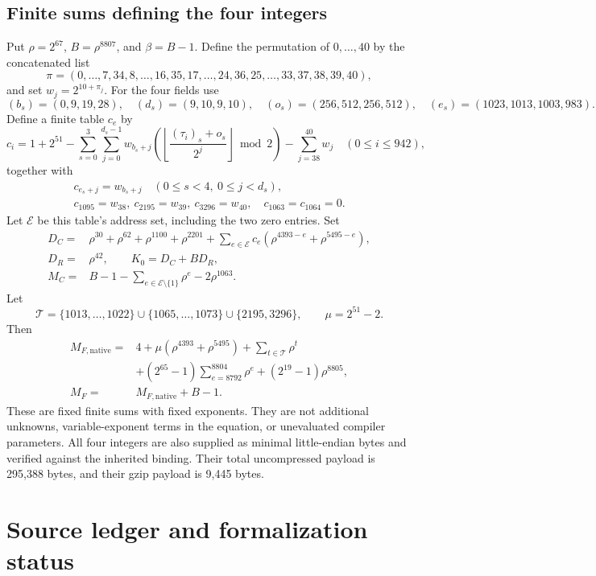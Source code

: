 \documentclass[11pt]{article}
\theoremstyle{definition}
\theoremstyle{remark}
\begin{document}
\subsection{Finite sums defining the four integers}

Put $\rho=2^{67}$, $B=\rho^{8807}$, and $\beta=B-1$. Define the permutation
of $0,\ldots,40$ by the concatenated list
\[
 \pi=(0,\ldots,7,34,8,\ldots,16,35,17,\ldots,24,36,
       25,\ldots,33,37,38,39,40),
\]
and set $w_j=2^{10+\pi_j}$. For the four fields use
\[
 (b_s)=(0,9,19,28),\quad (d_s)=(9,10,9,10),\quad
 (o_s)=(256,512,256,512),\quad (e_s)=(1023,1013,1003,983).
\]
Define a finite table $c_e$ by
\[
 c_i=1+2^{51}-\sum_{s=0}^3\sum_{j=0}^{d_s-1}
 w_{b_s+j}\left(\left\lfloor\frac{(\tau_i)_s+o_s}{2^j}\right\rfloor\bmod2\right)
       -\sum_{j=38}^{40}w_j\quad(0\le i\le942),
\]
together with
\[
 \begin{gathered}
 c_{e_s+j}=w_{b_s+j}\quad(0\le s<4,\ 0\le j<d_s),\\
 c_{1095}=w_{38},\ c_{2195}=w_{39},\ c_{3296}=w_{40},\quad
 c_{1063}=c_{1064}=0.
 \end{gathered}
\]
Let $\mathcal E$ be this table's address set, including the two zero entries.
Set
\begin{align*}
 D_C={}&\rho^{30}+\rho^{62}+\rho^{1100}+\rho^{2201}
       +\sum_{e\in\mathcal E}c_e(\rho^{4393-e}+\rho^{5495-e}),\\
 D_R={}&\rho^{42},\qquad K_0=D_C+BD_R,\\
 M_C={}&B-1-\sum_{e\in\mathcal E\setminus\{1\}}\rho^e-2\rho^{1063}.
\end{align*}
Let
\[
 \mathcal T=\{1013,\ldots,1022\}\cup\{1065,\ldots,1073\}
            \cup\{2195,3296\},\qquad \mu=2^{51}-2.
\]
Then
\begin{align*}
 M_{F,\mathrm{native}}={}&4+\mu(\rho^{4393}+\rho^{5495})
    +\sum_{t\in\mathcal T}\rho^t\\
 &+(2^{65}-1)\sum_{e=8792}^{8804}\rho^e+(2^{19}-1)\rho^{8805},\\
 M_F={}&M_{F,\mathrm{native}}+B-1.
\end{align*}
These are fixed finite sums with fixed exponents. They are not additional
unknowns, variable-exponent terms in the equation, or unevaluated compiler
parameters. All four integers are also supplied as minimal little-endian
bytes and verified against the inherited binding. Their total uncompressed
payload is 295,388 bytes, and their gzip payload is 9,445 bytes.

\section{Source ledger and formalization status}
\end{document}
